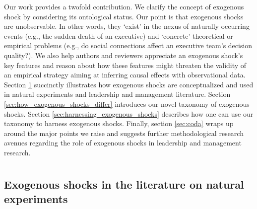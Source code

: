 \documentclass[11pt]{article}
\begin{document}
\begin{refsection}
Our work provides a twofold contribution. We clarify the concept of exogenous shock by considering its ontological status.  Our point is that exogenous shocks are unobservable. In other words, they `exist' in the nexus of naturally occurring events (e.g., the sudden death of an executive) and  `concrete' theoretical or empirical problems (e.g., do social connections affect an executive team's decision quality?).  We also help authors and reviewers appreciate an exogenous shock's key features and reason about how these features might threaten the validity of an empirical strategy aiming at inferring causal effects with observational data.  Section \ref{sec:what_exogenous_shocks} succinctly illustrates how exogenous shocks are conceptualized and used in natural experiments and leadership and management literature.  Section \ref{sec:how_exogenous_shocks_differ} introduces our novel taxonomy of exogenous shocks.  Section \ref{sec:harnessing_exogenous_shocks} describes how one can use our taxonomy to harness exogenous shocks. Finally, section \ref{sec:coda} wraps up around the major points we raise and suggests further methodological research avenues regarding the role of exogenous shocks in leadership and management research.

\section{}
\label{sec:what_exogenous_shocks}

\subsection{Exogenous shocks in the literature on natural experiments}
\label{subsec:exogenous_shocks_and_ne}


\end{refsection}
\end{document}
